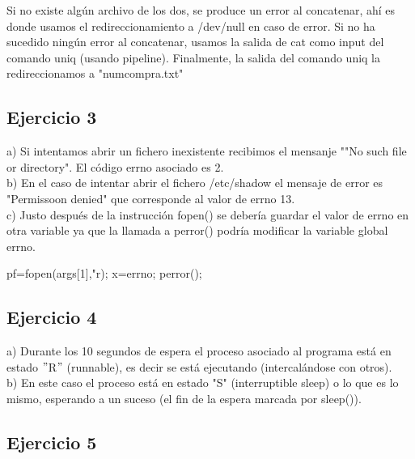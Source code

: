 \documentclass{article}
\begin{document}
Si no existe algún archivo de los dos, se produce un error al concatenar, ahí es donde usamos el redireccionamiento a /dev/null en caso de error.
Si no ha sucedido ningún error al concatenar, usamos la salida de cat como input del comando uniq (usando pipeline). Finalmente, 
la salida del comando uniq la redireccionamos a "numcompra.txt"

\subsection*{Ejercicio 3}

a) Si intentamos abrir un fichero inexistente recibimos el mensanje ""No such file or directory". El código errno asociado es 2.
\\

b) En el caso de intentar abrir el fichero /etc/shadow el  mensaje de error es "Permissoon denied" que corresponde al valor de errno 13.
\\

c) Justo después de la instrucción fopen() se debería guardar el valor de errno en otra variable ya que la llamada a perror() podría modificar la variable global errno.

pf=fopen(args[1],"r); 
x=errno; 
perror();

\subsection*{Ejercicio 4}

a) Durante los 10 segundos de espera el proceso asociado al programa está en estado $"$R$"$ (runnable), es decir se está ejecutando (intercalándose con otros).
\\

b) En este caso el proceso está en estado "S" (interruptible sleep) o lo que es lo mismo, esperando a un suceso (el fin de la espera marcada por sleep()). 


\subsection*{Ejercicio 5}
\end{document}
